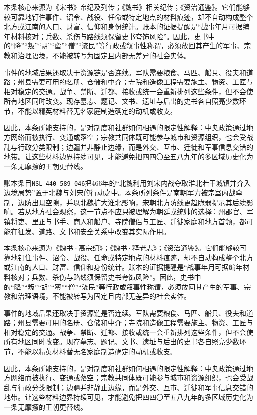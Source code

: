 本条核心来源为《宋书》帝纪及列传；《魏书》相关纪传；《资治通鉴》。它们能够较可靠地钉住事件、诏令、战役、任命或特定地点的材料痕迹，却不自动构成整个北方或江南的人口、财富、信仰和身份统计。账本的证据提醒是“战事年月可据编年材料核对；兵数、杀伤与路线须保留史书夸饰风险”。因此，史书中的“降”“叛”“胡”“蛮”“僧”“流民”等行政或叙事性称谓，必须放回其产生的军事、宗教和治理语境，不能被转写为固定且内部无差异的社会实体。

事件的地域后果还取决于资源链是否连续。军队需要粮食、马匹、船只、役夫和道路；州县需要可用的名册、仓储和中介；寺院和造像工程需要施主、物资、工匠与相对稳定的交通。战争、禁断、迁都、接收或统一会重新排列这些条件，但不会使所有地区同时改变。现存墓志、题记、文书、遗址与后出的史书各自照亮少数环节，不能以精英材料替无名家庭制造确定的动机或收支。

因此，本条所能支持的，是对制度和社群如何相遇的限定性解释：中央政策通过地方网络而被执行、变通或落空；宗教共同体既可能参与城市和资源组织，也会受战乱与行政分类限制；边疆并非静止边缘，而是外交、互市、迁徙和军事信息交错的地带。让这些材料边界持续可见，才能避免把四四〇至五八九年的多区域历史化为一条无摩擦的王朝更替线。

账本条目\texttt{NSL-440-589-046}把466年的“北魏利用刘宋内战夺取淮北若干城镇并介入边境局势”置于北魏与刘宋的行动之中。本条所列条件是南朝军力被宗室内战牵制，边防出现空隙，并以北魏扩大淮北影响，宋朝北方防线更趋脆弱提示其后续影响。若从地方社会观察，这一节点不应只被理解为朝廷或统帅的选择：州郡官、军镇将吏、里正与书手、商人和船户、寺院僧侣与工匠、迁徙家庭和地方首领，都可能在征发、道路、文书和安全关系中改变其实际作用。

本条核心来源为《魏书·高宗纪》；《魏书·释老志》；《资治通鉴》。它们能够较可靠地钉住事件、诏令、战役、任命或特定地点的材料痕迹，却不自动构成整个北方或江南的人口、财富、信仰和身份统计。账本的证据提醒是“战事年月可据编年材料核对；兵数、杀伤与路线须保留史书夸饰风险”。因此，史书中的“降”“叛”“胡”“蛮”“僧”“流民”等行政或叙事性称谓，必须放回其产生的军事、宗教和治理语境，不能被转写为固定且内部无差异的社会实体。

事件的地域后果还取决于资源链是否连续。军队需要粮食、马匹、船只、役夫和道路；州县需要可用的名册、仓储和中介；寺院和造像工程需要施主、物资、工匠与相对稳定的交通。战争、禁断、迁都、接收或统一会重新排列这些条件，但不会使所有地区同时改变。现存墓志、题记、文书、遗址与后出的史书各自照亮少数环节，不能以精英材料替无名家庭制造确定的动机或收支。

因此，本条所能支持的，是对制度和社群如何相遇的限定性解释：中央政策通过地方网络而被执行、变通或落空；宗教共同体既可能参与城市和资源组织，也会受战乱与行政分类限制；边疆并非静止边缘，而是外交、互市、迁徙和军事信息交错的地带。让这些材料边界持续可见，才能避免把四四〇至五八九年的多区域历史化为一条无摩擦的王朝更替线。

